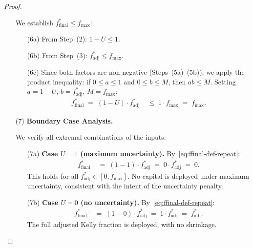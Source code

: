 \documentclass[12pt,openany]{book}
\numberwithin{equation}{chapter}
\theoremstyle{plain}
\theoremstyle{definition}
\theoremstyle{remark}
\numberwithin{equation}{chapter}
\theoremstyle{plain}
\begin{document}
\begin{proof}
\begin{enumerate}
        We establish $f^*_{\mathrm{final}} \leq f_{\max}$:
        \begin{enumerate}
          \item[\textup{(6a)}] From Step~(2):
                $1 - U \leq 1$.
          \item[\textup{(6b)}] From Step~(3):
                $f^*_{\mathrm{adj}} \leq f_{\max}$.
          \item[\textup{(6c)}] Since both factors are
                non-negative (Steps~(5a)--(5b)), we apply the
                product inequality: if $0 \leq a \leq 1$ and
                $0 \leq b \leq M$, then $ab \leq M$.
                Setting $a = 1-U$, $b = f^*_{\mathrm{adj}}$,
                $M = f_{\max}$:
                \begin{align}
                  f^*_{\mathrm{final}}
                  \;=\; (1-U)\cdot f^*_{\mathrm{adj}}
                  &\;\leq\; 1 \cdot f_{\max}
                  \;=\; f_{\max}.
                  \label{eq:ffinal-ub}
                \end{align}
        \end{enumerate}

  \item[\textup{(7)}] \textbf{Boundary Case Analysis.}

        We verify all extremal combinations of the inputs:
        \begin{enumerate}
          \item[\textup{(7a)}] \textbf{Case $U = 1$
                (maximum uncertainty).}
                By~\eqref{eq:ffinal-def-repeat}:
                \begin{align}
                  f^*_{\mathrm{final}}
                  &\;=\; (1 - 1)\cdot f^*_{\mathrm{adj}}
                  \;=\; 0 \cdot f^*_{\mathrm{adj}}
                  \;=\; 0.
                  \label{eq:ffinal-U1}
                \end{align}
                This holds for all
                $f^*_{\mathrm{adj}} \in [0, f_{\max}]$.
                No capital is deployed under maximum
                uncertainty, consistent with the intent of
                the uncertainty penalty.

          \item[\textup{(7b)}] \textbf{Case $U = 0$
                (no uncertainty).}
                By~\eqref{eq:ffinal-def-repeat}:
                \begin{align}
                  f^*_{\mathrm{final}}
                  &\;=\; (1 - 0)\cdot f^*_{\mathrm{adj}}
                  \;=\; 1 \cdot f^*_{\mathrm{adj}}
                  \;=\; f^*_{\mathrm{adj}}.
                  \label{eq:ffinal-U0}
                \end{align}
                The full adjusted Kelly fraction is
                deployed, with no shrinkage.


\end{enumerate}
\end{enumerate}
\end{proof}
\end{document}
